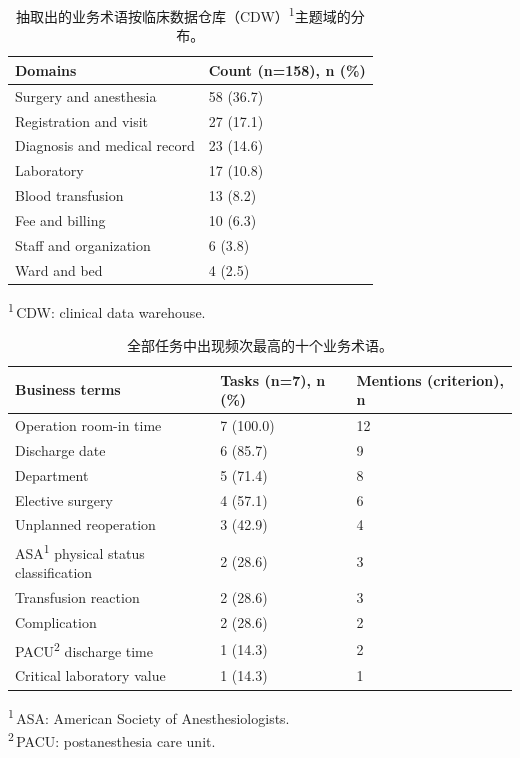 \documentclass[11pt,a4paper]{article}
\newcommand{\tnote}[1]{\textsuperscript{#1}}
\newcommand{\tabfoot}[1]{\par\vspace{2pt}\begingroup\raggedright\footnotesize
  \noindent #1\par\endgroup}
\newcommand{\tnotedef}[1]{\textsuperscript{#1}\,}
\begin{document}
\begin{table}[H]
\caption{抽取出的业务术语按临床数据仓库（CDW）\tnote{1}主题域的分布。}
\label{tab:domains}
\centering
\footnotesize
\begin{tabular*}{\linewidth}{@{\extracolsep{\fill}}ll@{}}
\toprule
Domains & Count (n=158), n (\%)\\
\midrule
Surgery and anesthesia        & 58 (36.7)\\
Registration and visit        & 27 (17.1)\\
Diagnosis and medical record  & 23 (14.6)\\
Laboratory                    & 17 (10.8)\\
Blood transfusion             & 13 (8.2)\\
Fee and billing               & 10 (6.3)\\
Staff and organization        & 6 (3.8)\\
Ward and bed                  & 4 (2.5)\\
\bottomrule
\end{tabular*}
\tabfoot{\tnotedef{1}CDW: clinical data warehouse.}
\end{table}

\begin{table}[H]
\caption{全部任务中出现频次最高的十个业务术语。}
\label{tab:terms}
\centering
\footnotesize
\begin{tabular*}{\linewidth}{@{\extracolsep{\fill}}lll@{}}
\toprule
Business terms & Tasks (n=7), n (\%) & Mentions (criterion), n\\
\midrule
Operation room-in time                 & 7 (100.0) & 12\\
Discharge date                         & 6 (85.7)  & 9\\
Department                             & 5 (71.4)  & 8\\
Elective surgery                       & 4 (57.1)  & 6\\
Unplanned reoperation                  & 3 (42.9)  & 4\\
ASA\tnote{1} physical status classification & 2 (28.6) & 3\\
Transfusion reaction                   & 2 (28.6)  & 3\\
Complication                           & 2 (28.6)  & 2\\
PACU\tnote{2} discharge time           & 1 (14.3)  & 2\\
Critical laboratory value              & 1 (14.3)  & 1\\
\bottomrule
\end{tabular*}
\tabfoot{\tnotedef{1}ASA: American Society of Anesthesiologists.\\
\tnotedef{2}PACU: postanesthesia care unit.}
\end{table}
\end{document}

